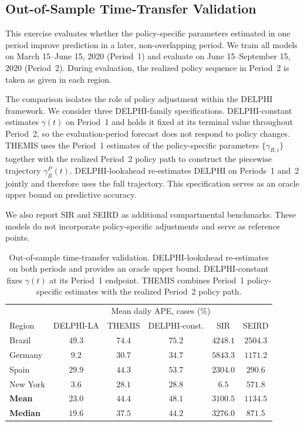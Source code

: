 \documentclass[msom,blindrev]{informs3} %
\newcommand{\rev}[1]{{\color{blue}#1}}
\begin{document}
\begin{APPENDICES}
\section{\rev{Out-of-Sample Time-Transfer Validation}}
\label{app:time_transfer}

{\color{blue}
This exercise evaluates whether the policy-specific parameters estimated in one period improve prediction in a later, non-overlapping period. We train all models on March 15--June 15, 2020 (Period~1) and evaluate on June 15--September 15, 2020 (Period~2). During evaluation, the realized policy sequence in Period~2 is taken as given in each region.
}

{\color{blue}
The comparison isolates the role of policy adjustment within the DELPHI framework. We consider three DELPHI-family specifications. DELPHI-constant estimates $\gamma(t)$ on Period~1 and holds it fixed at its terminal value throughout Period~2, so the evaluation-period forecast does not respond to policy changes. THEMIS uses the Period~1 estimates of the policy-specific parameters $\{\gamma_{R,i}\}$ together with the realized Period~2 policy path to construct the piecewise trajectory $\gamma_R^P(t)$. DELPHI-lookahead re-estimates DELPHI on Periods~1 and~2 jointly and therefore uses the full trajectory. This specification serves as an oracle upper bound on predictive accuracy.
}

{\color{blue}
We also report SIR and SEIRD as additional compartmental benchmarks. These models do not incorporate policy-specific adjustments and serve as reference points.
}

\begin{table}[htbp!]
\centering
{\color{blue}
\begin{tabular}{|l|ccccc|}
\hline
& \multicolumn{5}{c|}{Mean daily APE, cases (\%)} \\
Region & DELPHI-LA & THEMIS & DELPHI-const. & SIR & SEIRD \\\hline
Brazil     & $49.3$ & $\mathbf{74.4}$ & $75.2$ & $4248.1$ & $2504.3$ \\
Germany    & $9.2$  & $\mathbf{30.7}$ & $34.7$ & $5843.3$ & $1171.2$ \\
Spain      & $29.9$ & $\mathbf{44.3}$ & $53.7$ & $2304.0$ & $290.6$ \\
New York   & $3.6$  & $\mathbf{28.1}$ & $28.8$ & $6.5$    & $571.8$ \\\hline
\textbf{Mean}   & $23.0$ & $\mathbf{44.4}$ & $48.1$ & $3100.5$ & $1134.5$ \\
\textbf{Median} & $19.6$ & $\mathbf{37.5}$ & $44.2$ & $3276.0$ & $871.5$ \\\hline
\end{tabular}
}
\caption{\rev{Out-of-sample time-transfer validation. DELPHI-lookahead re-estimates on both periods and provides an oracle upper bound. DELPHI-constant fixes $\gamma(t)$ at its Period~1 endpoint. THEMIS combines Period~1 policy-specific estimates with the realized Period~2 policy path.}}
\label{tab:time_transfer_main}
\end{table}


\end{APPENDICES}
\end{document}
